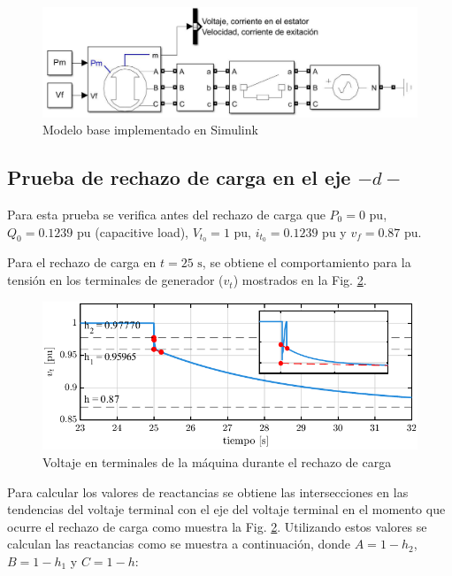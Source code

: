 \documentclass[conference]{IEEEtran}
\begin{document}
\begin{figure}[H]
    \centering
    \includegraphics[width=\linewidth]{Fig/Modelo_Simulink.pdf}
    \caption{Modelo base implementado en Simulink}
    \label{fig:Modelo_Simulink}
\end{figure}

\subsection{Prueba de rechazo de carga en el eje $-d-$}

Para esta prueba se verifica antes del rechazo de carga que $P_0=0\text{ pu}$, $Q_0=0.1239\text{ pu}$ (capacitive load),
$V_{t_0}=1\text{ pu}$, $i_{t_0}=0.1239\text{ pu}$ y $v_f=0.87\text{ pu}$.

Para el rechazo de carga en $t=25\text{ s}$, se obtiene el comportamiento para la tensión
en los terminales de generador ($v_t$) mostrados en la Fig. \ref{fig:fig1}.

\begin{figure}[H]
    \centering
    \includegraphics[width=\linewidth]{Fig/fig1.pdf}
    \caption{Voltaje en terminales de la máquina durante el rechazo de carga}
    \label{fig:fig1}
\end{figure}

Para calcular los valores de reactancias se obtiene las intersecciones en las tendencias del
voltaje terminal con el eje del voltaje terminal en el momento que ocurre el rechazo de carga
como muestra la Fig. \ref{fig:fig1}. Utilizando estos valores se calculan las reactancias como
se muestra a continuación, donde $A=1-h_2$, $B=1-h_1$ y $C=1-h$:
\end{document}
